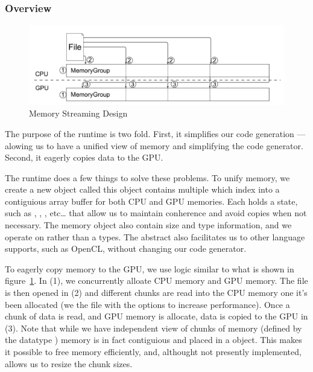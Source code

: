 \subsubsection{Overview}


\begin{figure}
\centering
\includegraphics[scale=0.2]{fig/memory_group.pdf}
\caption{Memory Streaming Design}
\label{fig:memorygroup}
\centering
\end{figure}

The purpose of the runtime is two fold.
First, it simplifies our code generation --- alowing us to 
	have a unified view of memory and simplifying the 
	code generator.
Second, it eagerly copies data to the GPU.

The runtime does a few things to solve these problems.
To unify memory, we create a new object called 
	this object contains multiple  which 
	index into a contiguious array buffer for both CPU and GPU memories.
Each  holds a state, such as
	, ,
	, etc\ldots
	that allow us to maintain conherence and avoid copies when
	not necessary.
The memory object also contain size and type information,
	and we operate on  rather than a 
	types.
The abstract also facilitates us to other language supports, such 
	as OpenCL, without changing our code generator.

To eagerly copy memory to the GPU, we use logic similar to what is
	shown in figure~\ref{fig:memorygroup}.
In (1), we concurrently alloate CPU memory and GPU memory.
The file is then opened in (2) and different chunks are read into
	the CPU memory one it's been allocated (we  the file
	with the  options to increase
	performance).
Once a chunk of data is read, and GPU memory is allocate, data 
	is copied to the GPU in (3).
Note that while we have independent view of chunks of memory 
	(defined by the datatype ) memory is in fact
	contiguious and placed in a  object.
This makes it possible to free memory efficiently, and, althought
	not presently implemented, allows us to resize the chunk
	sizes.
